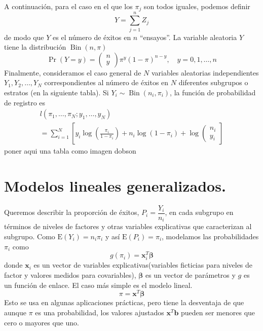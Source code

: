 \documentclass[
]{book}
\begin{document}
A continuación, para el caso en el que los \(\pi_{j}\) son todos iguales, podemos definir
\[
Y = \sum_{j=1}^{n}Z_{j}
\]
de modo que \(Y\) es el número de éxitos en \(n\) ``ensayos''. La variable aleatoria \(Y\) tiene la distribución \(\operatorname{Bin}(n, \pi)\)
\begin{equation}
\operatorname{Pr}(Y = y) = \left(\begin{array}{l}
n\\
y
\end{array}\right) \pi^{y}(1- \pi)^{n-y}, \quad y = 0,1, \ldots, n
\end{equation}
Finalmente, consideramos el caso general de \(N\) variables aleatorias independientes
\(Y_{1}, Y_{2}, \ldots, Y_{N}\) correspondientes al número de éxitos en \(N\) diferentes subgrupos o estratos (en la siguiente tabla). Si \(Y_{i}\sim \operatorname{Bin} \left(n_{i}, \pi_{i}\right)\), la función de probabilidad de registro es
\[
\begin{array}{l}
l\left(\pi_{1}, \ldots, \pi_{N} ; y_{1}, \ldots, y_{N}\right) \\
=\sum_{i=1}^{N}\left[y_{i} \log \left(\frac{\pi_{i}}{1-\pi_{i}}\right)+n_{i} \log \left(1-\pi_{i}\right)+\log \left(\begin{array}{l}
n_{i} \\
y_{i}
\end{array}\right]\right.
\end{array}
\]
poner aqui una tabla como imagen dobson

\hypertarget{modelos-lineales-generalizados.}{%
\section{Modelos lineales generalizados.}\label{modelos-lineales-generalizados.}}

Queremos describir la proporción de éxitos, \(P_{i}= \dfrac{Y_{i}}{n_{i}}\), en cada subgrupo en términos de niveles de factores y otras variables explicativas que caracterizan al subgrupo. Como \(\mathrm{E}\left(Y_{i}\right)=n_{i} \pi_{i}\) y así \(\mathrm{E} \left(P_{i}\right)=\pi_{i}\), modelamos las probabilidades \(\pi_{i}\) como
\[
g\left(\pi_{i}\right)=\mathbf{x}_{i}^{T}\boldsymbol{\beta}
\]
donde \(\mathbf{x}_{i}\) es un vector de variables explicativas(variables ficticias para niveles de factor y valores medidos para covariables), \(\boldsymbol{\beta}\) es un vector de parámetros y \(g\) es un función de enlace. El caso más simple es el modelo lineal.
\[
\pi=\mathbf{x}^{T}\boldsymbol{\beta}
\]
Esto se usa en algunas aplicaciones prácticas, pero tiene la desventaja de que aunque \(\pi\) es una probabilidad, los valores ajustados \(\mathbf{x}^ {T}\mathbf{b}\) pueden ser menores que cero o mayores que uno.
\end{document}
